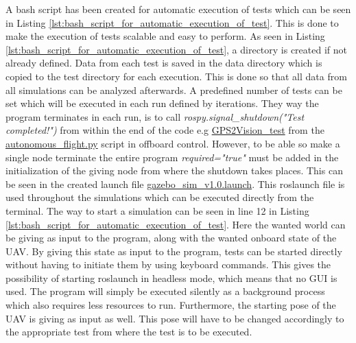 \documentclass[../Head/report.tex]{subfiles}
\begin{document}
A bash script has been created for automatic execution of tests which can be seen in Listing \ref{lst:bash_script_for_automatic_execution_of_test}. This is done to make the execution of tests scalable and easy to perform. As seen in Listing \ref{lst:bash_script_for_automatic_execution_of_test}, a directory is created if not already defined. Data from each test is saved in the data directory which is copied to the test directory for each execution. This is done so that all data from all simulations can be analyzed afterwards. A predefined number of tests can be set which will be executed in each run defined by iterations. They way the program terminates in each run, is to call \textit{rospy.signal\_shutdown("Test completed!")} from within the end of the code e.g \href{https://github.com/Kenil16/master\_project/blob/0ca6b6205ecfd8cc6a819d7cd30c979fcd39e6e8/software/ros\_workspace/src/offboard\_control/autonomous\_flight.py#L266}{GPS2Vision\_test} from the \href{https://github.com/Kenil16/master\_project/blob/master/software/ros\_workspace/src/offboard\_control/autonomous\_flight.py}{autonomous\_flight.py} script in offboard control. However, to be able so make a single node terminate the entire program \textit{required="true"} must be added in the initialization of the giving node from where the shutdown takes places. This can be seen in the created launch file \href{https://github.com/Kenil16/master\_project/blob/0ca6b6205ecfd8cc6a819d7cd30c979fcd39e6e8/software/ros\_workspace/PX4-software/launch/gazebo\_sim\_v1.0.launch#L63}{gazebo\_sim\_v1.0.launch}. This roslaunch file is used throughout the simulations which can be executed directly from the terminal. The way to start a simulation can be seen in line 12 in Listing \ref{lst:bash_script_for_automatic_execution_of_test}. Here the wanted world can be giving as input to the program, along with the wanted onboard state of the UAV. By giving this state as input to the program, tests can be started directly without having to initiate them by using keyboard commands. This gives the possibility of starting roslaunch in headless mode, which means that no GUI is used. The program will simply be executed silently as a background process which also requires less resources to run. Furthermore, the starting pose of the UAV is giving as input as well. This pose will have to be changed accordingly to the appropriate test from where the test is to be executed. 
\end{document}
